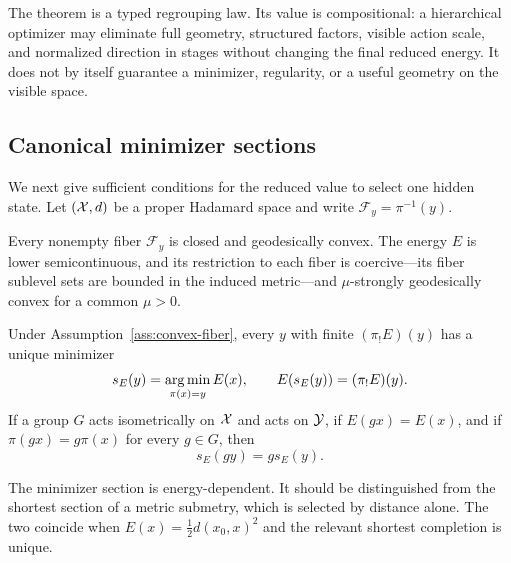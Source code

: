 The theorem is a typed regrouping law.  Its value is compositional: a
hierarchical optimizer may eliminate full geometry, structured factors,
visible action scale, and normalized direction in stages without changing the
final reduced energy.  It does not by itself guarantee a minimizer, regularity,
or a useful geometry on the visible space.

\subsection{Canonical minimizer sections}

We next give sufficient conditions for the reduced value to select one hidden
state.  Let \((\mathcal X,d)\) be a proper Hadamard space and write
\(\mathcal F_y=\pi^{-1}(y)\).

\begin{assumption}
\label{ass:convex-fiber}
Every nonempty fiber \(\mathcal F_y\) is closed and geodesically convex.
The energy \(E\) is lower semicontinuous, and its restriction to each fiber is
coercive---its fiber sublevel sets are bounded in the induced metric---and
\(\mu\)-strongly geodesically convex for a common \(\mu>0\).
\end{assumption}

\begin{theorem}
\label{thm:canonical-lift}
Under Assumption~\ref{ass:convex-fiber}, every \(y\) with finite
\((\pi_!E)(y)\) has a
unique minimizer
\begin{equation}
  s_E(y)=\operatorname*{arg\,min}_{\pi(x)=y}E(x),
  \qquad
  E(s_E(y))=(\pi_!E)(y).
  \label{eq:canonical-lift}
\end{equation}
If a group \(G\) acts isometrically on \(\mathcal X\) and acts on \(\mathcal Y\),
if \(E(gx)=E(x)\), and if \(\pi(gx)=g\pi(x)\) for every \(g\in G\), then
\begin{equation}
  s_E(gy)=g s_E(y).
  \label{eq:canonical-equivariance}
\end{equation}
\end{theorem}

The minimizer section is energy-dependent.  It should be distinguished from
the shortest section of a metric submetry, which is selected by distance alone.
The two coincide when \(E(x)=\tfrac12d(x_0,x)^2\) and the relevant shortest
completion is unique.
